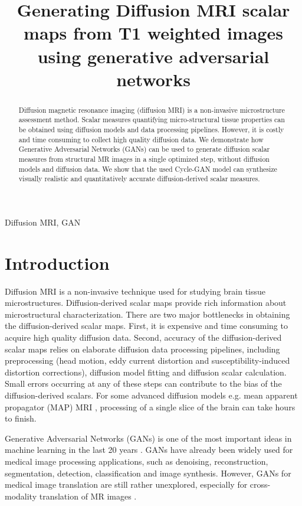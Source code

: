 \documentclass{article}
\title{Generating Diffusion MRI scalar maps from T1 weighted images using generative adversarial networks}
\begin{document}
\maketitle
\begin{abstract}
  Diffusion magnetic resonance imaging (diffusion MRI) is a non-invasive microstructure assessment method. Scalar measures quantifying micro-structural tissue properties can be obtained using diffusion models and data processing pipelines. However, it is costly and time consuming to collect high quality  diffusion data. We demonstrate how Generative Adversarial Networks (GANs) can be used to generate diffusion scalar measures from  structural MR images in a single optimized step, without diffusion models and diffusion data. We show that the used Cycle-GAN model can synthesize visually realistic and quantitatively accurate diffusion-derived scalar measures.
\end{abstract}
\begin{keywords}
Diffusion MRI, GAN
\end{keywords}
\section{Introduction}
\label{sec:intro}

Diffusion MRI is a non-invasive technique used for studying brain tissue microstructures. Diffusion-derived scalar maps provide rich information about microstructural characterization. There are two major bottlenecks in obtaining the diffusion-derived scalar maps. First, it is expensive and time consuming to acquire high quality diffusion data. Second, accuracy of the diffusion-derived scalar maps relies on elaborate diffusion data processing pipelines, including preprocessing (head motion, eddy current distortion and susceptibility-induced distortion corrections), diffusion model fitting and diffusion scalar calculation. Small errors occurring at any of these steps can contribute to the bias of the diffusion-derived scalars. For some advanced diffusion models e.g. mean apparent propagator (MAP) MRI \cite{ozarslan2013mean}, processing of a single slice of the brain can take hours to finish.

Generative Adversarial Networks (GANs) is one of the most important ideas in machine learning in the last 20 years \cite{goodfellow2014generative}. GANs have already been widely used for medical image processing applications, such as denoising, reconstruction, segmentation, detection, classification and image synthesis. However, GANs for medical image translation are still rather unexplored, especially for cross-modality translation of MR images \cite{kazeminia2018gans}.
\end{document}
